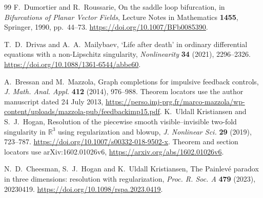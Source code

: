 \begin{thebibliography}{99}
F.~Dumortier and R.~Roussarie,
\newblock On the saddle loop bifurcation,
\newblock in \emph{Bifurcations of Planar Vector Fields},
Lecture Notes in Mathematics \textbf{1455}, Springer, 1990, pp.~44--73.
\newblock \url{https://doi.org/10.1007/BFb0085390}.

T.~D.~Drivas and A.~A.~Mailybaev,
\newblock `Life after death' in ordinary differential equations with a non-Lipschitz singularity,
\newblock \emph{Nonlinearity} \textbf{34} (2021), 2296--2326.
\newblock \url{https://doi.org/10.1088/1361-6544/abbe60}.

A.~Bressan and M.~Mazzola,
\newblock Graph completions for impulsive feedback controls,
\newblock \emph{J. Math. Anal. Appl.} \textbf{412} (2014), 976--988.
\newblock Theorem locators use the author manuscript dated 24 July 2013,
\url{https://perso.imj-prg.fr/marco-mazzola/wp-content/uploads/mazzola-pub/feedbackimp15.pdf}.
K.~Uldall Kristiansen and S.~J.~Hogan,
\newblock Resolution of the piecewise smooth visible--invisible two-fold
singularity in $\mathbb R^3$ using regularization and blowup,
\newblock \emph{J. Nonlinear Sci.} \textbf{29} (2019), 723--787.
\newblock \url{https://doi.org/10.1007/s00332-018-9502-x}.
\newblock Theorem and section locators use arXiv:1602.01026v6,
\url{https://arxiv.org/abs/1602.01026v6}.

N.~D.~Cheesman, S.~J.~Hogan and K.~Uldall Kristiansen,
\newblock The Painlev\'e paradox in three dimensions: resolution with regularization,
\newblock \emph{Proc. R. Soc. A} \textbf{479} (2023), 20230419.
\newblock \url{https://doi.org/10.1098/rspa.2023.0419}.

\end{thebibliography}

